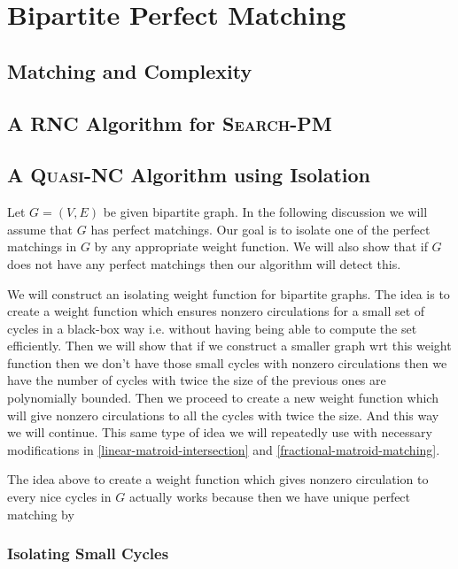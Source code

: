 \chapter{Bipartite Perfect Matching}
\section{Matching and Complexity}
\section{A \textsc{RNC} Algorithm for \textsc{Search-PM}}
\section{A \textsc{Quasi-NC} Algorithm using Isolation}
Let $G=(V,E)$ be given bipartite graph. In the following discussion we will assume that $G$ has perfect matchings. Our goal is to isolate one of the perfect matchings in $G$ by any appropriate weight function. We will also show that if $G$ does not have any perfect matchings then our algorithm will detect this.

We will construct an isolating weight function for bipartite graphs. The idea is to create a weight function which ensures nonzero circulations for a small set of cycles in a black-box way i.e. without having being able to compute the set efficiently. Then we will show that if we construct a smaller graph wrt this weight function then we don't have those small cycles with nonzero circulations then we have the number of cycles with twice the size of the previous ones are polynomially bounded. Then we proceed to create a new weight function which will give nonzero circulations to all the cycles with twice the size. And this way we will continue. This same type of idea we will repeatedly use with necessary modifications in \autoref{linear-matroid-intersection} and \autoref{fractional-matroid-matching}.

The idea above to create a weight function which gives nonzero circulation to every nice cycles in $G$ actually works because  then we have unique perfect matching by 
\subsection{Isolating Small Cycles}

